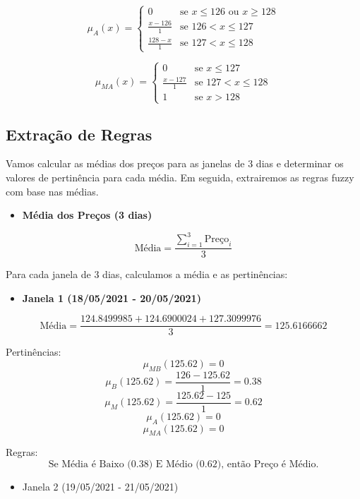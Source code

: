 \documentclass[a4paper, 12pt]{article}
\begin{document}
\[
\mu_{A}(x) = \begin{cases}
0 & \text{se } x \leq 126 \text{ ou } x \geq 128 \\
\frac{x - 126}{1} & \text{se } 126 < x \leq 127 \\
\frac{128 - x}{1} & \text{se } 127 < x \leq 128
\end{cases}
\]

\[
\mu_{MA}(x) = \begin{cases}
0 & \text{se } x \leq 127 \\
\frac{x - 127}{1} & \text{se } 127 < x \leq 128 \\
1 & \text{se } x > 128
\end{cases}
\]

\subsection{Extração de Regras}

Vamos calcular as médias dos preços para as janelas de 3 dias e determinar os valores de pertinência para cada média. Em seguida, extrairemos as regras fuzzy com base nas médias.

\begin{itemize}
    \item \textbf{Média dos Preços (3 dias)}
\end{itemize}


\[
\text{Média} = \frac{\sum_{i=1}^{3} \text{Preço}_i}{3}
\]

Para cada janela de 3 dias, calculamos a média e as pertinências:

\begin{itemize}
    \item \textbf{Janela 1 (18/05/2021 - 20/05/2021)}
\end{itemize}

\[
\text{Média} = \frac{124.8499985 + 124.6900024 + 127.3099976}{3} = 125.6166662
\]

Pertinências:
\[
\mu_{MB}(125.62) = 0
\]
\[
\mu_{B}(125.62) = \frac{126 - 125.62}{1} = 0.38
\]
\[
\mu_{M}(125.62) = \frac{125.62 - 125}{1} = 0.62
\]
\[
\mu_{A}(125.62) = 0
\]
\[
\mu_{MA}(125.62) = 0
\]

Regras:
\[
\text{Se Média é Baixo (0.38) E Médio (0.62), então Preço é Médio.}
\]

\begin{itemize}
    \item Janela 2 (19/05/2021 - 21/05/2021)
\end{itemize}
\end{document}
